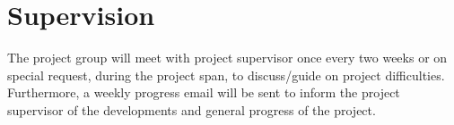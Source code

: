 \section*{Supervision}
The project group will meet with project supervisor once every two weeks or on special request, during the project span, to discuss/guide on project difficulties.\\
Furthermore, a weekly progress email will be sent to inform the project supervisor of the developments and general progress of the project.